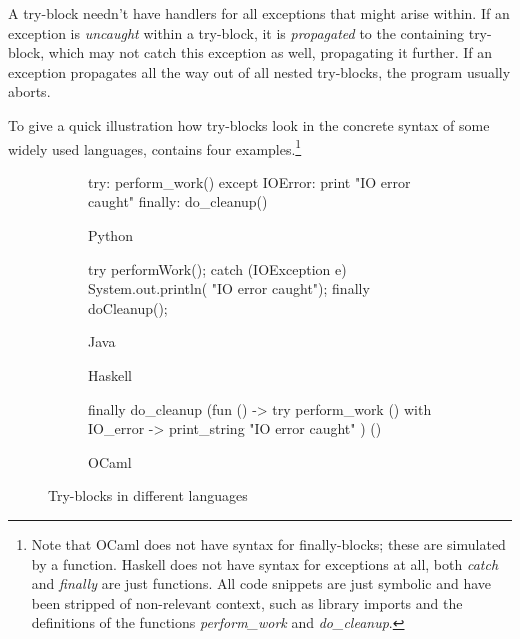 A try-block needn't have handlers for all exceptions that might arise within. If an exception
is \emph{uncaught} within a try-block, it is \emph{propagated} to the containing try-block,
which may not catch this exception as well, propagating it further.
If an exception propagates all the way out of all nested try-blocks, the program usually
aborts.

To give a quick illustration how try-blocks look in the concrete syntax of some widely used
languages,  contains four examples.\footnote{Note that OCaml does not
have syntax for finally-blocks; these are simulated by a function. Haskell does not have
syntax for exceptions at all, both \emph{catch} and \emph{finally} are just functions.
All code snippets are just symbolic and have been stripped of non-relevant context, such
as library imports and the definitions of the functions \emph{perform\_work}
and \emph{do\_cleanup}.}

\begin{figure}
%
\begin{subfigure}[b]{0.46\textwidth}\begin{codepy}
try:
	perform_work()
except IOError:
	print "IO error caught"
finally:
	do_cleanup()
\end{codepy}\caption{Python}\end{subfigure}
%
\begin{subfigure}[b]{0.46\textwidth}\begin{codejava}
try {
	performWork();
} catch (IOException e) {
	System.out.println(
	    "IO error caught");
} finally {
	doCleanup();
}
\end{codejava}\caption{Java}\end{subfigure}

\begin{subfigure}[b]{0.46\textwidth}\caption{Haskell}\end{subfigure}
%
\begin{subfigure}[b]{0.46\textwidth}\begin{codeml}
finally do_cleanup (fun () ->
  try perform_work ()
  with IO_error ->
    print_string "IO error caught"
) ()
\end{codeml}\caption{OCaml}\end{subfigure}

\caption{Try-blocks in different languages}
\label{fig:try-blocks}
\end{figure}

